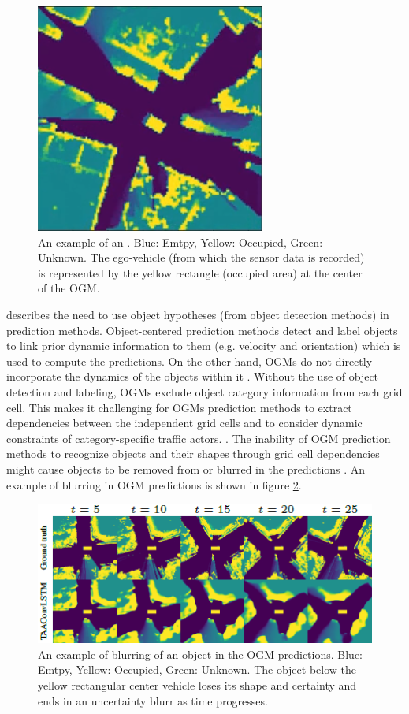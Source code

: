 \begin{figure}[h]
	\centering
	\includegraphics[width=0.3\linewidth]{Figures/Title_Page_OGM}
	\caption{An example of an . Blue: Emtpy, Yellow: Occupied, Green: Unknown. The ego-vehicle (from which the sensor data is recorded) is represented by the yellow rectangle (occupied area) at the center of the \gls{OGM}.}
	\label{fig:ogm_example}
\end{figure}



\cite{hormann2020long} describes the need to use object hypotheses (from object detection methods) in prediction methods. Object-centered prediction methods detect and label objects to link prior dynamic information to them (e.g. velocity and orientation) which is used to compute the predictions. On the other hand, \glspl{OGM} do not directly incorporate the dynamics of the objects within it \cite{itkina2019dynamic}. Without the use of object detection and labeling, \glspl{OGM} exclude object category information from each grid cell. This makes it challenging for \glspl{OGM} prediction methods to extract dependencies between the independent grid cells and to consider dynamic constraints of category-specific traffic actors. \cite{wu2020motionnet} \cite{hormann2020long}. The inability of \gls{OGM} prediction methods to recognize objects and their shapes through grid cell dependencies might cause objects to be removed from or blurred in the predictions \cite{lange2020attention}. An example of blurring in \gls{OGM} predictions is shown in figure \ref{fig:ogm_blurr}. \\

\begin{figure}[h]
	\centering
	\includegraphics[width=0.5\linewidth]{Figures/Introduction/Blurring_OGM}
	\caption{An example of blurring of an object in the \gls{OGM} predictions\cite{lange2020attention}. Blue: Emtpy, Yellow: Occupied, Green: Unknown. The object below the yellow rectangular center vehicle loses its shape and certainty and ends in an uncertainty blurr as time progresses.}
	\label{fig:ogm_blurr}
\end{figure}


